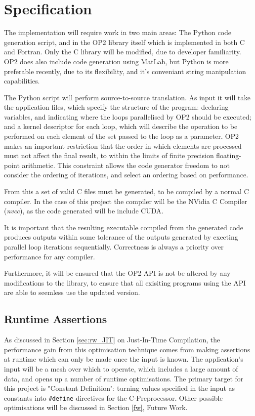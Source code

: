 
\section{Specification}
The implementation will require work in two main areas: The Python code generation script, and in the OP2 library itself which is implemented in both C and Fortran. Only the C library will be modified, due to developer familiarity. OP2 does also include code generation using MatLab, but Python is more preferable recently, due to its flexibility, and it's conveniant string manipulation capabilities.
\par
The Python script will perform source-to-source translation. As input it will take the application files, which specify the structure of the program: declaring variables, and indicating where the loops parallelised by OP2 should be executed; and a kernel descriptor for each loop, which will describe the operation to be performed on each element of the set passed to the loop as a parameter. OP2 makes an important restriction that the order in which elements are processed must not affect the final result, to within the limits of finite precision floating-point arithmetic\cite[p3]{op2main}. This constraint allows the code generator freedom to not consider the ordering of iterations, and select an ordering based on performance.
\par
From this a set of valid C files must be generated, to be compiled by a normal C compiler. In the case of this project the compiler will be the NVidia C Compiler (\textit{nvcc}), as the code generated will be include CUDA.
\par
It is important that the resulting executable compiled from the generated code produces outputs within some tolerance of the outputs generated by execting parallel loop iterations sequentially. Correctness is always a priority over performance for any compiler.
\par
Furthermore, it will be ensured that the OP2 API is not be altered by any modifications to the library, to ensure that all exisiting programs using the API are able to seemless use the updated version.

\subsection{Runtime Assertions}
As discussed in Section \ref{sec:rw_JIT} on Just-In-Time Compilation, the performance gain from this optimisation technique comes from making assertions at runtime which can only be made once the input is known. The application's input will be a mesh over which to operate, which includes a large amount of data, and opens up a number of runtime optimisations. The primary target for this project is "Constant Definition": turning values specified in the input as constants into \verb|#define| directives for the C-Preprocessor. Other possible optimisations will be discussed in Section \ref{fw}, Future Work.

